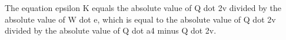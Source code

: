 The equation epsilon K equals the absolute value of Q dot 2v divided by the absolute value of W dot e, which is equal to the absolute value of Q dot 2v divided by the absolute value of Q dot a4 minus Q dot 2v.